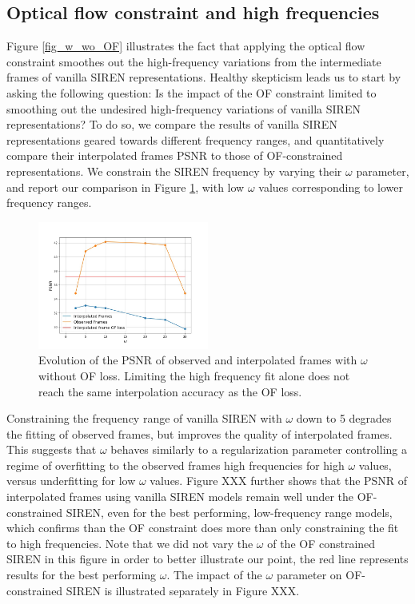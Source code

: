 \documentclass{article}
\begin{document}
\subsection{Optical flow constraint and high frequencies}

Figure \ref{fig_w_wo_OF} illustrates the fact that applying the optical flow constraint smoothes
out the high-frequency variations from the intermediate frames of vanilla SIREN representations.
Healthy skepticism leads us to start by asking the following question:
Is the impact of the OF constraint limited to smoothing out the undesired high-frequency variations of vanilla SIREN representations?
To do so, we compare the results of vanilla SIREN representations geared towards different frequency ranges,
and quantitatively compare their interpolated frames PSNR to those of OF-constrained representations.
We constrain the SIREN frequency by varying their $\omega$ parameter, and report our comparison in Figure \ref{fig_omega},
with low $\omega$ values corresponding to lower frequency ranges.

\begin{figure}[t]
\centering
\includegraphics[width=0.5\textwidth]{"omega_wo_of"}
\caption{Evolution of the PSNR of observed and interpolated frames with $\omega$ without OF loss.
Limiting the high frequency fit alone does not reach the same interpolation accuracy as the OF loss.}
\label{fig_omega}
\end{figure}

Constraining the frequency range of vanilla SIREN with $\omega$ down to 5 degrades the fitting of observed frames,
but improves the quality of interpolated frames.
This suggests that $\omega$ behaves similarly to a regularization parameter
controlling a regime of overfitting to the observed frames high frequencies for high $\omega$ values,
versus underfitting for low $\omega$ values.
Figure XXX further shows that the PSNR of interpolated frames using vanilla SIREN models remain well under the OF-constrained SIREN,
even for the best performing, low-frequency range models,
which confirms than the OF constraint does more than only constraining the fit to high frequencies.
Note that we did not vary the $\omega$ of the OF constrained SIREN in this figure in order to better illustrate our point,
the red line represents results for the best performing $\omega$.
The impact of the $\omega$ parameter on OF-constrained SIREN is illustrated separately in Figure XXX.
\end{document}
